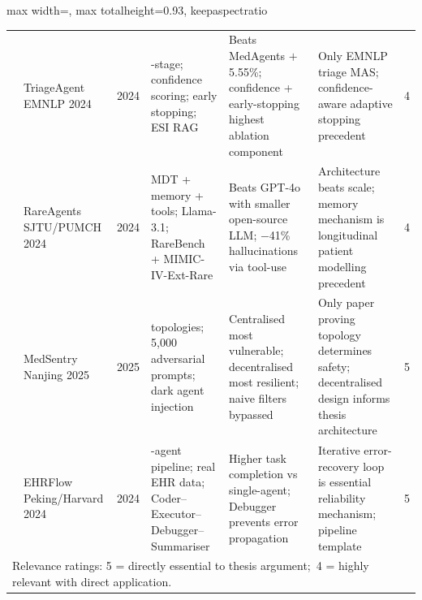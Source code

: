 \begin{table}[p]
\begin{adjustbox}{max width=\textwidth, max totalheight=0.93\textheight, keepaspectratio}
\begin{tabular}{%
  c
  >{\raggedright\arraybackslash}p{2.4cm}
  c
  >{\raggedright\arraybackslash}p{3.5cm}
  >{\raggedright\arraybackslash}p{3.9cm}
  >{\raggedright\arraybackslash}p{3.4cm}
  c}
  & TriageAgent \newline EMNLP 2024
  & 2024
  & 5-stage; confidence scoring; early stopping; ESI RAG
  & Beats MedAgents $+$5.55\%; confidence + early-stopping highest ablation component
  & Only EMNLP triage MAS; confidence-aware adaptive stopping precedent
  & 4 \\[3pt]
\cite{Chen2024RareAgents}
  & RareAgents \newline SJTU/PUMCH 2024
  & 2024
  & MDT + memory + tools; Llama-3.1; RareBench + MIMIC-IV-Ext-Rare
  & Beats GPT-4o with smaller open-source LLM; $-$41\% hallucinations via tool-use
  & Architecture beats scale; memory mechanism is longitudinal patient modelling precedent
  & 4 \\[3pt]
\cite{Chen2025MedSentry}
  & MedSentry \newline Nanjing 2025
  & 2025
  & 4 topologies; 5{,}000 adversarial prompts; dark agent injection
  & Centralised most vulnerable; decentralised most resilient; naive filters bypassed
  & Only paper proving topology determines safety; decentralised design informs thesis architecture
  & 5 \\[3pt]
\cite{Wu2024EHRFlow}
  & EHRFlow \newline Peking/Harvard 2024
  & 2024
  & 4-agent pipeline; real EHR data; Coder--Executor--Debugger--Summariser
  & Higher task completion vs single-agent; Debugger prevents error propagation
  & Iterative error-recovery loop is essential reliability mechanism; pipeline template
  & 5 \\
\bottomrule
\multicolumn{7}{l}{\small Relevance ratings: 5 = directly essential to thesis argument;\
  4 = highly relevant with direct application.}
\end{tabular}
\end{adjustbox}
\end{table}
